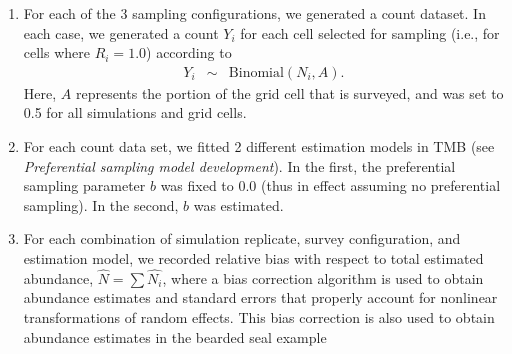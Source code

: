 \documentclass[times,mee,doublespace,]{besauth2}
\begin{document}
\begin{flushleft}
\begin{enumerate}
  \item For each of the 3 sampling configurations, we generated a count dataset.  In each case, we generated a count $Y_i$ for each cell selected for sampling (i.e., for cells where $R_i=1.0$) according to
      \begin{eqnarray*}
        Y_i & \sim & \textrm{Binomial}(N_i,A).
      \end{eqnarray*}
      Here, $A$ represents the portion of the grid cell that is surveyed, and was set to 0.5 for all simulations and grid cells.
  \item For each count data set, we fitted 2 different estimation models in TMB (see \textit{Preferential sampling model development}).  In the first, the preferential sampling parameter $b$ was fixed to 0.0 (thus in effect assuming no preferential sampling).  In the second, $b$ was estimated.
  \item For each combination of simulation replicate, survey configuration, and estimation model, we recorded relative bias with respect to total estimated abundance, $\hat{N} = \sum \hat{N_i}$, where a bias correction algorithm \citep{TierneyEtAl1989,ThorsonKristensenInPress} is used to obtain abundance estimates and standard errors that properly account for nonlinear transformations of random effects.  This bias correction is also used to obtain abundance estimates in the bearded seal example
\end{enumerate}





\pagebreak


\end{flushleft}
\end{document}
